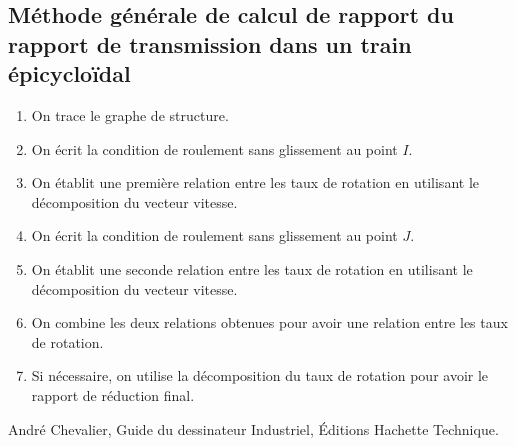 \documentclass[10pt,oneside]{article}
\begin{document}
\subsection{Méthode générale de calcul de rapport du rapport de transmission dans un train épicycloïdal}

\begin{methode}
\begin{enumerate}
\item On trace le graphe de structure.
\item On écrit la condition de roulement sans glissement au point $I$. 
\item On établit une première relation entre les taux de rotation en utilisant le décomposition du vecteur vitesse.
\item On écrit la condition de roulement sans glissement au point $J$.
\item On établit une seconde relation  entre les taux de rotation en utilisant le décomposition du vecteur vitesse.
\item On combine les deux relations obtenues pour avoir une relation entre les taux de rotation.
\item Si nécessaire, on utilise la décomposition du taux de rotation pour avoir le rapport de réduction final.
\end{enumerate}
\end{methode}


\begin{thebibliography}{2}
 André Chevalier, Guide du dessinateur Industriel, Éditions Hachette Technique.
\end{thebibliography}
\end{document}
